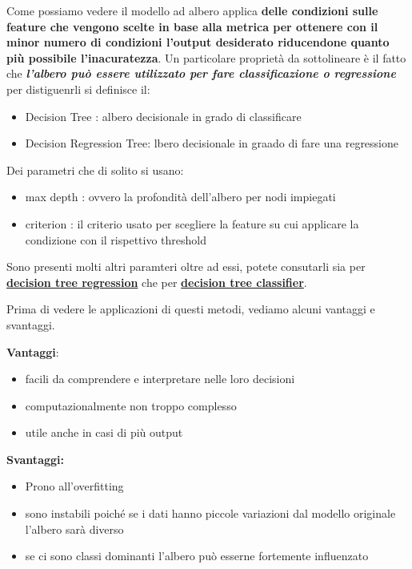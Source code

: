 \documentclass[11pt]{article}
\providecommand{\tightlist}{%
      \setlength{\itemsep}{0pt}\setlength{\parskip}{0pt}}
\begin{document}
    Come possiamo vedere il modello ad albero applica \textbf{delle
condizioni sulle feature che vengono scelte in base alla metrica per
ottenere con il minor numero di condizioni l'output desiderato
riducendone quanto più possibile l'inacuratezza}. Un particolare
proprietà da sottolineare è il fatto che \textbf{\emph{l'albero può
essere utilizzato per fare classificazione o regressione}} per
distiguenrli si definisce il:

\begin{itemize}
\tightlist
\item
  Decision Tree : albero decisionale in grado di classificare
\item
  Decision Regression Tree: lbero decisionale in graado di fare una
  regressione
\end{itemize}

Dei parametri che di solito si usano:

\begin{itemize}
\tightlist
\item
  max depth : ovvero la profondità dell'albero per nodi impiegati
\item
  criterion : il criterio usato per scegliere la feature su cui
  applicare la condizione con il rispettivo threshold
\end{itemize}

Sono presenti molti altri paramteri oltre ad essi, potete consutarli sia
per
\textbf{\href{https://scikit-learn.org/stable/modules/generated/sklearn.tree.DecisionTreeRegressor.html\#sklearn.tree.DecisionTreeRegressor}{decision
tree regression}} che per
\textbf{\href{https://scikit-learn.org/stable/modules/generated/sklearn.tree.DecisionTreeClassifier.html\#sklearn.tree.DecisionTreeClassifier}{decision
tree classifier}}.

Prima di vedere le applicazioni di questi metodi, vediamo alcuni
vantaggi e svantaggi.

\textbf{Vantaggi}:

\begin{itemize}
\tightlist
\item
  facili da comprendere e interpretare nelle loro decisioni
\item
  computazionalmente non troppo complesso
\item
  utile anche in casi di più output
\end{itemize}

\textbf{Svantaggi:}

\begin{itemize}
\tightlist
\item
  Prono all'overfitting
\item
  sono instabili poiché se i dati hanno piccole variazioni dal modello
  originale l'albero sarà diverso
\item
  se ci sono classi dominanti l'albero può esserne fortemente
  influenzato
\end{itemize}
\end{document}
